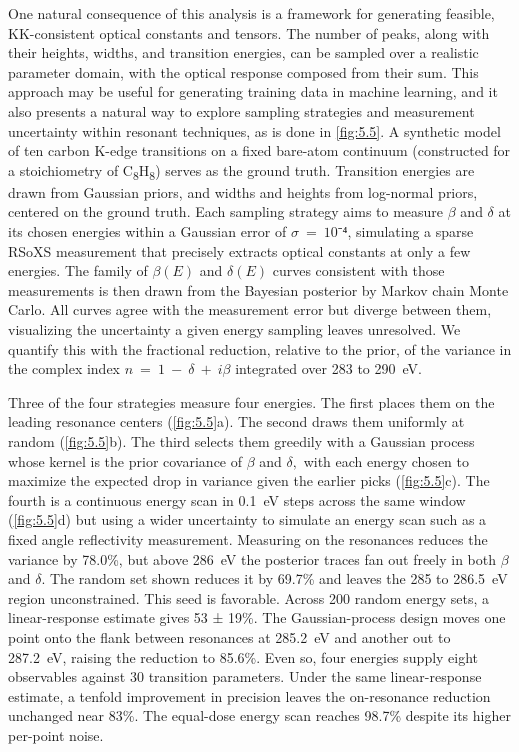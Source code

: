 One natural consequence of this analysis is a framework for generating feasible, KK-consistent optical constants and tensors. The number of peaks, along with their heights, widths, and transition energies, can be sampled over a realistic parameter domain, with the optical response composed from their sum. This approach may be useful for generating training data in machine learning, and it also presents a natural way to explore sampling strategies and measurement uncertainty within resonant techniques, as is done in \cref{fig:5.5}. A synthetic model of ten carbon K-edge transitions on a fixed bare-atom continuum (constructed for a stoichiometry of C\textsubscript{8}H\textsubscript{8}) serves as the ground truth. Transition energies are drawn from Gaussian priors, and widths and heights from log-normal priors, centered on the ground truth. Each sampling strategy aims to measure \(\beta\) and \(\delta\) at its chosen energies within a Gaussian error of \(\sigma\  = \ 10⁻⁴\), simulating a sparse RSoXS measurement that precisely extracts optical constants at only a few energies. The family of \(\beta(E)\) and \(\delta(E)\) curves consistent with those measurements is then drawn from the Bayesian posterior by Markov chain Monte Carlo. All curves agree with the measurement error but diverge between them, visualizing the uncertainty a given energy sampling leaves unresolved. We quantify this with the fractional reduction, relative to the prior, of the variance in the complex index \(n\  = \ 1\  - \ \delta\  + \ i\beta\) integrated over 283 to \qty{290}{eV}.

Three of the four strategies measure four energies. The first places them on the leading resonance centers (\cref{fig:5.5}a). The second draws them uniformly at random (\cref{fig:5.5}b). The third selects them greedily with a Gaussian process whose kernel is the prior covariance of \(\beta\) and \(\delta,\) with each energy chosen to maximize the expected drop in variance given the earlier picks (\cref{fig:5.5}c). The fourth is a continuous energy scan in \qty{0.1}{eV} steps across the same window (\cref{fig:5.5}d) but using a wider uncertainty to simulate an energy scan such as a fixed angle reflectivity measurement. Measuring on the resonances reduces the variance by 78.0\%, but above \qty{286}{eV} the posterior traces fan out freely in both \(\beta\) and \(\delta\). The random set shown reduces it by 69.7\% and leaves the 285 to \qty{286.5}{eV} region unconstrained. This seed is favorable. Across 200 random energy sets, a linear-response estimate gives 53 ± 19\%. The Gaussian-process design moves one point onto the flank between resonances at \qty{285.2}{eV} and another out to \qty{287.2}{eV}, raising the reduction to 85.6\%. Even so, four energies supply eight observables against 30 transition parameters. Under the same linear-response estimate, a tenfold improvement in precision leaves the on-resonance reduction unchanged near 83\%. The equal-dose energy scan reaches 98.7\% despite its higher per-point noise.

